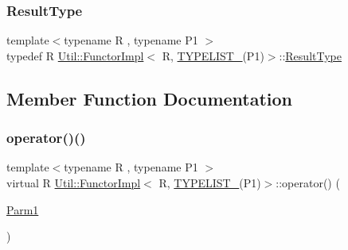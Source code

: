 \mbox{\label{classUtil_1_1FunctorImpl_3_01R_00_01TYPELIST__1_07P1_08_4_a15eeae50d81fe84dfae39ecc200cb08a}} 
\subsubsection{\texorpdfstring{ResultType}{ResultType}\hspace{0.1cm}{\footnotesize\ttfamily [2/2]}}
{\footnotesize\ttfamily template$<$typename R , typename P1 $>$ \\
typedef R \mbox{\hyperlink{classUtil_1_1FunctorImpl}{Util\+::\+Functor\+Impl}}$<$ R, \mbox{\hyperlink{install_2include_2adat_2typelist_8h_a6a7a6aa3dece450c8d239713e2952df7}{T\+Y\+P\+E\+L\+I\+S\+T\+\_}}(P1)$>$\+::\mbox{\hyperlink{structUtil_1_1Private_1_1FunctorImplBase_a5e95fd30fdd89f3c5080b68ab5891bc3}{Result\+Type}}}



\subsection{Member Function Documentation}
\mbox{\label{classUtil_1_1FunctorImpl_3_01R_00_01TYPELIST__1_07P1_08_4_a62c984afa0dca11e0101cfcba2052a8c}} 
\subsubsection{\texorpdfstring{operator()()}{operator()()}\hspace{0.1cm}{\footnotesize\ttfamily [1/2]}}
{\footnotesize\ttfamily template$<$typename R , typename P1 $>$ \\
virtual R \mbox{\hyperlink{classUtil_1_1FunctorImpl}{Util\+::\+Functor\+Impl}}$<$ R, \mbox{\hyperlink{install_2include_2adat_2typelist_8h_a6a7a6aa3dece450c8d239713e2952df7}{T\+Y\+P\+E\+L\+I\+S\+T\+\_}}(P1)$>$\+::operator() (\begin{DoxyParamCaption}\item[{\mbox{\hyperlink{structUtil_1_1Private_1_1FunctorImplBase_a9d61e693d6c616dea5bd9d9073c7d21a}{Parm1}}}]{ }\end{DoxyParamCaption})\hspace{0.3cm}{\ttfamily [pure virtual]}}

